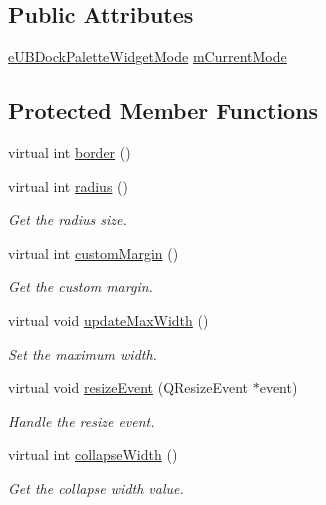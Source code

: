 \subsection*{Public Attributes}
\begin{DoxyCompactItemize}
\item 
\hyperlink{_u_b_dock_palette_widget_8h_af3b2828ed1bf91ad13c73e4e1b3b529e}{e\-U\-B\-Dock\-Palette\-Widget\-Mode} \hyperlink{class_u_b_dock_palette_a32701f18f9d1f1b31c568fc0349632c5}{m\-Current\-Mode}
\end{DoxyCompactItemize}
\subsection*{Protected Member Functions}
\begin{DoxyCompactItemize}
\item 
virtual int \hyperlink{class_u_b_dock_palette_ac21a897b4fba940a69a092cd870d2421}{border} ()
\item 
virtual int \hyperlink{class_u_b_dock_palette_a8c845992626e3b2345084699e3bb953c}{radius} ()
\begin{DoxyCompactList}\small\item\em Get the radius size. \end{DoxyCompactList}\item 
virtual int \hyperlink{class_u_b_dock_palette_a7c2692990bfc41eddf826a1cb713223f}{custom\-Margin} ()
\begin{DoxyCompactList}\small\item\em Get the custom margin. \end{DoxyCompactList}\item 
virtual void \hyperlink{class_u_b_dock_palette_aaa2875f5907c022762b4cde1ee69e961}{update\-Max\-Width} ()
\begin{DoxyCompactList}\small\item\em Set the maximum width. \end{DoxyCompactList}\item 
virtual void \hyperlink{class_u_b_dock_palette_abe601a30ebea6b08998224bad8eaa7e8}{resize\-Event} (Q\-Resize\-Event $\ast$event)
\begin{DoxyCompactList}\small\item\em Handle the resize event. \end{DoxyCompactList}\item 
virtual int \hyperlink{class_u_b_dock_palette_a95fc2885262fe2f881eb3d842dd75df5}{collapse\-Width} ()
\begin{DoxyCompactList}\small\item\em Get the collapse width value. \end{DoxyCompactList}\end{DoxyCompactItemize}
